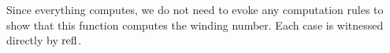 Since everything computes, we do not need to evoke any computation rules to show that
this function computes the winding number. Each case is witnessed directly by $\operatorname{refl}$.
\begin{code}%
\>[0]\AgdaFunction{\AgdaUnderscore{}}\AgdaSpace{}%
\AgdaSymbol{:}\AgdaSpace{}%
\AgdaSpace{}%
\AgdaSpace{}%
\AgdaSpace{}%
\<%
\\
\>[0]\AgdaSymbol{\AgdaUnderscore{}}\AgdaSpace{}%
\AgdaSymbol{=}\AgdaSpace{}%
\<%
\\
%
\\[\AgdaEmptyExtraSkip]%
\>[0]\AgdaFunction{\AgdaUnderscore{}}\AgdaSpace{}%
\AgdaSymbol{:}\AgdaSpace{}%
\AgdaSpace{}%
\AgdaSymbol{(}\AgdaSpace{}%
\AgdaSpace{}%
\AgdaSymbol{)}\AgdaSpace{}%
\AgdaSpace{}%
\<%
\\
\>[0]\AgdaSymbol{\AgdaUnderscore{}}\AgdaSpace{}%
\AgdaSymbol{=}\AgdaSpace{}%
\<%
\\
%
\\[\AgdaEmptyExtraSkip]%
\>[0]\AgdaFunction{\AgdaUnderscore{}}\AgdaSpace{}%
\AgdaSymbol{:}\AgdaSpace{}%
\AgdaSpace{}%
\AgdaSymbol{(}\AgdaSpace{}%
\AgdaSymbol{)}\AgdaSpace{}%
\AgdaSpace{}%
\AgdaSymbol{(}\AgdaOperator{\AgdaFunction{-}}\AgdaSpace{}%
\AgdaSymbol{)}\<%
\\
\>[0]\AgdaSymbol{\AgdaUnderscore{}}\AgdaSpace{}%
\AgdaSymbol{=}\AgdaSpace{}%
\<%
\end{code}


%
%



